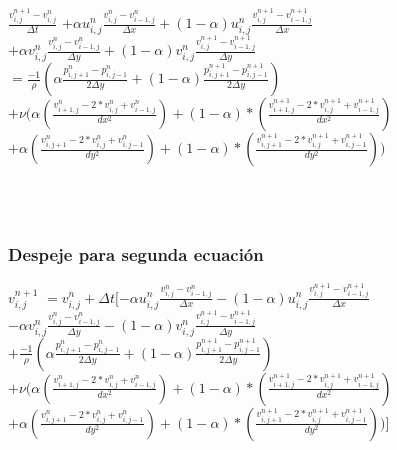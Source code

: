 \documentclass[a4paper]{article}
\begin{document}
~\\
~\\

$ \frac{ {v}^{n+1}_{i,j} - v^{n}_{i,j}}{ \Delta t} $
$+ \alpha {u}^{n}_{i,j} \frac{ {v}^{n}_{i,j} - v^{n}_{i-1,j}}{ \Delta x} + (1 - \alpha) {u}^{n}_{i,j} \frac{ {v}^{n+1}_{i,j} - v^{n+1}_{i-1,j}}{ \Delta x}$ 
\\
$+ \alpha {v}^{n}_{i,j} \frac{ {v}^{n}_{i,j} - v^{n}_{i-1,j}}{ \Delta y} + (1 - \alpha) {v}^{n}_{i,j} \frac{ {v}^{n+1}_{i,j} - v^{n+1}_{i-1,j}}{ \Delta y}$
\\
$= \frac{-1}{\rho} ( \alpha \frac{p^{n}_{i,j+1} - p^{n}_{i,j-1} }{ 2 \Delta y } + (1 - \alpha) \frac{p^{n+1}_{i,j+1} - p^{n+1}_{i,j-1} }{ 2 \Delta y })  $
\\
$+ \nu (\alpha (\frac{ v^{n}_{i+1,j} - 2*v^{n}_{i,j} + v^{n}_{i-1,j}}{dx^2}) + (1-\alpha)*(\frac{ v^{n+1}_{i+1,j} - 2*v^{n+1}_{i,j} + v^{n+1}_{i-1,j}}{dx^2})$
\\
$+ \alpha (\frac{ v^{n}_{i,j+1} - 2*v^{n}_{i,j} + v^{n}_{i,j-1}}{dy^2}) + (1-\alpha)*(\frac{ v^{n+1}_{i,j+1} - 2*v^{n+1}_{i,j} + v^{n+1}_{i,j-1}}{dy^2}))$


~\\
~\\

\subsubsection{Despeje para segunda ecuación}

$ {v}^{n+1}_{i,j}  $
$= v^{n}_{i,j} + \Delta t [- \alpha {u}^{n}_{i,j} \frac{ {v}^{n}_{i,j} - v^{n}_{i-1,j}}{ \Delta x} - (1 - \alpha) {u}^{n}_{i,j} \frac{ {v}^{n+1}_{i,j} - v^{n+1}_{i-1,j}}{ \Delta x}$ 
\\
$- \alpha {v}^{n}_{i,j} \frac{ {v}^{n}_{i,j} - v^{n}_{i-1,j}}{ \Delta y} - (1 - \alpha) {v}^{n}_{i,j} \frac{ {v}^{n+1}_{i,j} - v^{n+1}_{i-1,j}}{ \Delta y}$
\\
$+ \frac{-1}{\rho} ( \alpha \frac{p^{n}_{i,j+1} - p^{n}_{i,j-1} }{ 2 \Delta y } + (1 - \alpha) \frac{p^{n+1}_{i,j+1} - p^{n+1}_{i,j-1} }{ 2 \Delta y })  $
\\
$+ \nu (\alpha (\frac{ v^{n}_{i+1,j} - 2*v^{n}_{i,j} + v^{n}_{i-1,j}}{dx^2}) + (1-\alpha)*(\frac{ v^{n+1}_{i+1,j} - 2*v^{n+1}_{i,j} + v^{n+1}_{i-1,j}}{dx^2})$
\\
$+ \alpha (\frac{ v^{n}_{i,j+1} - 2*v^{n}_{i,j} + v^{n}_{i,j-1}}{dy^2}) + (1-\alpha)*(\frac{ v^{n+1}_{i,j+1} - 2*v^{n+1}_{i,j} + v^{n+1}_{i,j-1}}{dy^2}))]$
\end{document}
